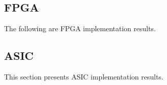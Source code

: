 \ifdefined\FPGA
\subsection{FPGA}
The following are FPGA implementation results.

\fi


\ifdefined\ASIC
\subsection{ASIC}
This section presents ASIC implementation results.

\fi
